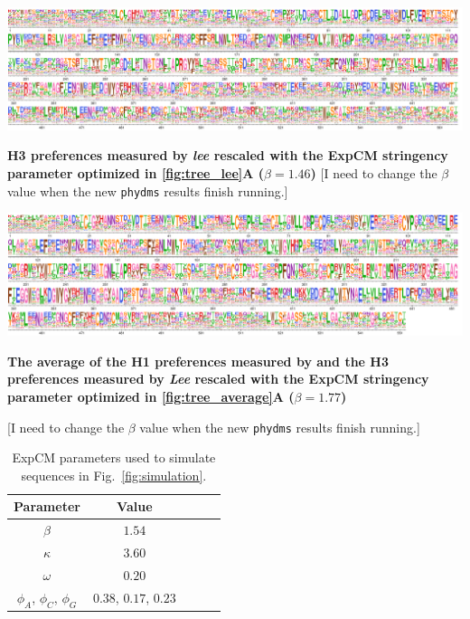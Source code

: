 \documentclass[11pt]{article}
\newcommand\skhcomment[1]{{\color{cyan}[#1]}}
\begin{document}
\begin{suppfig}[H]
\centerline{\includegraphics[width=\textwidth]{figures/prefs_lee}}
\caption{\label{suppfig:prefs_lee}
\textbf{H3 preferences measured by \textit{lee} rescaled with the ExpCM stringency parameter optimized in \ref{fig:tree_lee}A  ($\beta = 1.46$)}
\skhcomment{I need to change the $\beta$ value when the new \texttt{phydms} results finish running.} 
}
\end{suppfig}

\begin{suppfig}[H]
\centerline{\includegraphics[width=\textwidth]{figures/prefs_average}}
\caption{\label{fig:prefs_average}
\textbf{The average of the H1 preferences measured by \cite{doud2016accurate} and the H3 preferences measured by \textit{Lee} rescaled with the ExpCM stringency parameter optimized in \ref{fig:tree_average}A  ($\beta = 1.77$)}}
\skhcomment{I need to change the $\beta$ value when the new \texttt{phydms} results finish running.}
\end{suppfig}
 


\begin{table}[t!]
\caption{\label{tab:simulation_params}
ExpCM parameters used to simulate sequences in Fig.~\ref{fig:simulation}.}
      \begin{tabular}{ccccc}
        \hline
          Parameter & Value\\ \hline
       	$\beta$ & $1.54$\\
	$\kappa$ & $3.60$\\
	$\omega$ & $0.20$\\
	$\phi_A$, $\phi_C$, $\phi_G$& $0.38$, $0.17$, $0.23$\\
      \end{tabular}
\end{table}
\end{document}

